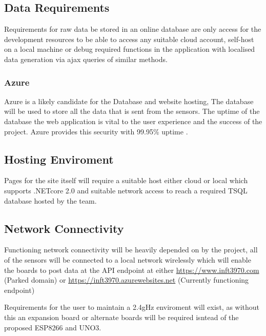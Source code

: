 \documentclass{article}
\begin{document}
        \subsection{Data Requirements}
            Requirements for raw data be stored in an online database are only access
            for the development resources to be able to access any suitable cloud account, 
            self-host on a local machine or debug required functions in the application with 
            localised data generation via ajax queries of similar methods.
            
            \subsubsection{Azure}
                Azure is a likely candidate for the Database and website hosting, The database will be used to store 
                all the data that is sent from the sensors. The uptime of the database the web application is vital 
                to the user experience and the success of the project. Azure provides this security 
                with 99.95\% uptime \cite{AzureUptime}.

        \subsection{Hosting Enviroment}
            Pages for the site itself will require a suitable host either cloud or local which
            supports .NETcore 2.0\cite{DotNetCore2} and suitable network access to reach a
            required TSQL\cite{TSQL} database hosted by the team.
        
        \subsection{Network Connectivity}
            Functioning network connectivity will be heavily depended on by the project,
            all of the sensors will be connected to a local network wirelessly which will enable the boards
            to post data at the API endpoint at either \url{https://www.inft3970.com} (Parked domain) or 
            \url{https://inft3970.azurewebsites.net} (Currently functioning endpoint)
            \par
            Requirements for the user to maintain a 2.4gHz enviroment will exist, as without this an expansion board
            or alternate boards will be required isntead of the proposed ESP8266\cite{ESP8266} and UNO3\cite{UNO3}.
        
\end{document}
